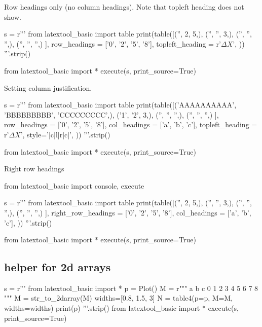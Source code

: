 \newpage
Row headings only (no column headings).
Note that topleft heading does not show.

\begin{python}
s = r'''
from latextool_basic import table
print(table([('',  2, 5,),
             ('', '', 3,),
             ('', '', '',),
             ('', '', '',)
            ],
            row_headings = ['0', '2', '5', '8'],
            topleft_heading = r'$\Delta X$',
           ))
'''.strip()

from latextool_basic import *
execute(s, print_source=True)
\end{python}






\newpage
Setting column justification.
\begin{python}
s = r'''
from latextool_basic import table
print(table([('AAAAAAAAAA',  'BBBBBBBBB', 'CCCCCCCCC',),
             ('1', '2', 3,),
             ('', '', '',),
             ('', '', '',)
            ],
            row_headings = ['0', '2', '5', '8'],
            col_headings = ['a', 'b', 'c'],
            topleft_heading = r'$\Delta X$',
            style='|c|l|r|c|',
           ))
'''.strip()

from latextool_basic import *
execute(s, print_source=True)
\end{python}


\newpage
Right row headings

\begin{python}
from latextool_basic import console, execute

s = r'''
from latextool_basic import table
print(table([('',  2, 5,),
             ('', '', 3,),
             ('', '', '',),
             ('', '', '',)
            ],
            right_row_headings = ['0', '2', '5', '8'],
            col_headings = ['a', 'b', 'c'],
           ))
'''.strip()

from latextool_basic import *
execute(s, print_source=True)
\end{python}

\newpage{}
\newpage{}
\newpage{}

\newpage\subsection{helper for 2d arrays}

\begin{python}
s = r'''
from latextool_basic import *
p = Plot()
M = r"""
a b c
0 1 2
3 4 5
6 7 8
"""
M = str_to_2darray(M)
widths=[0.8, 1.5, 3]
N = table4(p=p, M=M, widths=widths)
print(p)
'''.strip()
from latextool_basic import *
execute(s, print_source=True)
\end{python}

